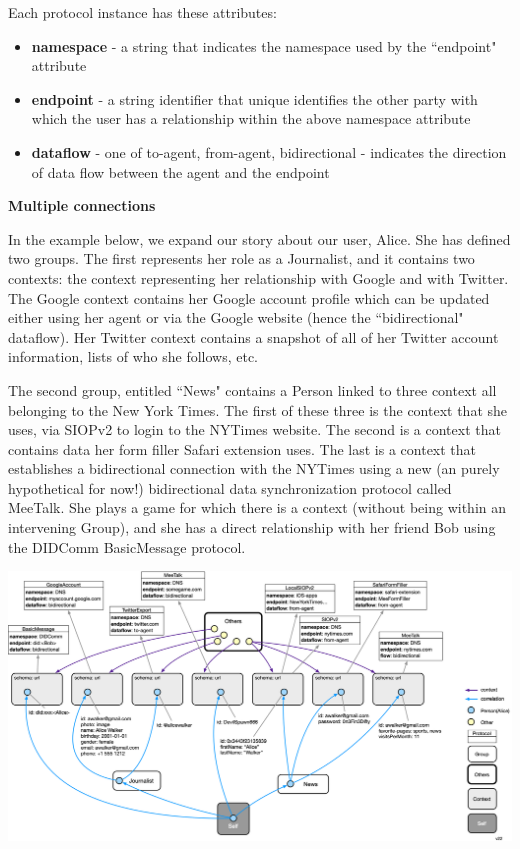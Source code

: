 \documentclass[11pt, oneside]{article}   	%
\begin{document}
Each protocol instance has these attributes:

\begin{itemize}
\item \textbf{namespace} - a string that indicates the namespace used by the ``endpoint" attribute
\item \textbf{endpoint} - a string identifier that unique identifies the other party with which the user has a relationship within the above namespace attribute
\item \textbf{dataflow} - one of {to-agent, from-agent, bidirectional} - indicates the direction of data flow between the agent and the endpoint
\end{itemize}

\textbf{Multiple connections}

In the example below, we expand our story about our user, Alice. She has defined two groups. The first represents her role as a Journalist, and it contains two contexts: the context representing her relationship with Google and with Twitter. The Google context contains her Google account profile which can be updated either using her agent or via the Google website (hence the ``bidirectional" dataflow). Her Twitter context contains a snapshot of all of her Twitter account information, lists of who she follows, etc. 

The second group, entitled ``News" contains a Person linked to three context all belonging to the New York Times. The first of these three is the context that she uses, via SIOPv2 to login to the NYTimes website. The second is a context that contains data her form filler Safari extension uses. The last is a context that establishes a bidirectional connection with the NYTimes using a new (an purely hypothetical for now!) bidirectional data synchronization protocol called MeeTalk. She plays a game for which there is a context (without being within an intervening Group), and she has a direct relationship with her friend Bob using the DIDComm BasicMessage protocol.  

\includegraphics[width=\textwidth]{./images/multiple-connections.png}
\end{document}
